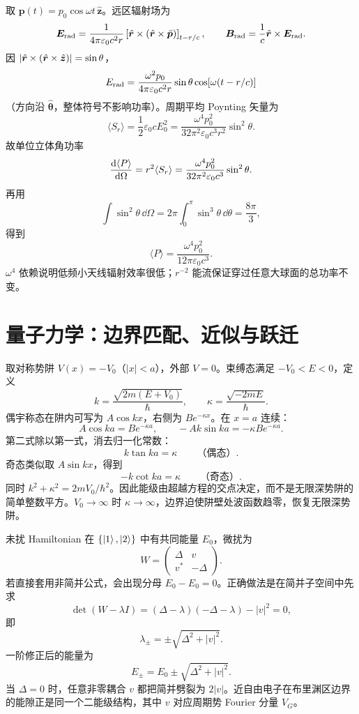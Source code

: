 \begin{examplebox}[title=例 6：由推迟势得到简谐偶极子的平均辐射功率]
取 $\bm p(t)=p_0\cos\omega t\,\hat{\bm z}$。远区辐射场为
\[
\bm E_{\rm rad}
=\frac{1}{4\pi\varepsilon_0c^2r}
\left[\hat{\bm r}\times(\hat{\bm r}\times\ddot{\bm p})\right]_{t-r/c},
\qquad
\bm B_{\rm rad}=\frac1c\hat{\bm r}\times\bm E_{\rm rad}.
\]
因 $\left|\hat{\bm r}\times(\hat{\bm r}\times\hat{\bm z})\right|=\sin\theta$，
\[
E_{\rm rad}
=\frac{\omega^2p_0}{4\pi\varepsilon_0c^2r}
\sin\theta\cos[\omega(t-r/c)]
\]
（方向沿 $\hat{\bm\theta}$，整体符号不影响功率）。周期平均 Poynting 矢量为
\[
\langle S_r\rangle
=\frac12\varepsilon_0cE_0^2
=\frac{\omega^4p_0^2}{32\pi^2\varepsilon_0c^3r^2}\sin^2\theta.
\]
故单位立体角功率
\[
\frac{\mathrm d \langle P\rangle}{\mathrm d \Omega}
=r^2\langle S_r\rangle
=\frac{\omega^4p_0^2}{32\pi^2\varepsilon_0c^3}\sin^2\theta.
\]
再用
\[
\int\sin^2\theta\,\dd\Omega
=2\pi\int_0^\pi\sin^3\theta\,\dd\theta=\frac{8\pi}{3},
\]
得到
\[
\boxed{\langle P\rangle
=\frac{\omega^4p_0^2}{12\pi\varepsilon_0c^3}}.
\]
$\omega^4$ 依赖说明低频小天线辐射效率很低；$r^{-2}$ 能流保证穿过任意大球面的总功率不变。
\end{examplebox}

\section{量子力学：边界匹配、近似与跃迁}

\begin{examplebox}[title=例 7：有限深方势阱的束缚态条件]
取对称势阱 $V(x)=-V_0$（$|x|<a$），外部 $V=0$。束缚态满足 $-V_0<E<0$，定义
\[
k=\frac{\sqrt{2m(E+V_0)}}{\hbar},\qquad
\kappa=\frac{\sqrt{-2mE}}{\hbar}.
\]
偶宇称态在阱内可写为 $A\cos kx$，右侧为 $Be^{-\kappa x}$。在 $x=a$ 连续：
\[
A\cos ka=Be^{-\kappa a},
\qquad
-Ak\sin ka=-\kappa Be^{-\kappa a}.
\]
第二式除以第一式，消去归一化常数：
\[
\boxed{k\tan ka=\kappa}\qquad\text{（偶态）}.
\]
奇态类似取 $A\sin kx$，得到
\[
\boxed{-k\cot ka=\kappa}\qquad\text{（奇态）}.
\]
同时 $k^2+\kappa^2=2mV_0/\hbar^2$。因此能级由超越方程的交点决定，而不是无限深势阱的简单整数平方。$V_0\to\infty$ 时 $\kappa\to\infty$，边界迫使阱壁处波函数趋零，恢复无限深势阱。
\end{examplebox}

\begin{examplebox}[title=例 8：二能级系统的简并微扰]
未扰 Hamiltonian 在 $\{\left|1\right\rangle,\left|2\right\rangle\}$ 中有共同能量 $E_0$，微扰为
\[
W=\begin{pmatrix}\Delta&v\\v^*&-\Delta\end{pmatrix}.
\]
若直接套用非简并公式，会出现分母 $E_0-E_0=0$。正确做法是在简并子空间中先求
\[
\det(W-\lambda I)
=(\Delta-\lambda)(-\Delta-\lambda)-|v|^2=0,
\]
即
\[
\lambda_\pm=\pm\sqrt{\Delta^2+|v|^2}.
\]
一阶修正后的能量为
\[
E_\pm=E_0\pm\sqrt{\Delta^2+|v|^2}.
\]
当 $\Delta=0$ 时，任意非零耦合 $v$ 都把简并劈裂为 $2|v|$。近自由电子在布里渊区边界的能隙正是同一个二能级结构，其中 $v$ 对应周期势 Fourier 分量 $V_G$。
\end{examplebox}

